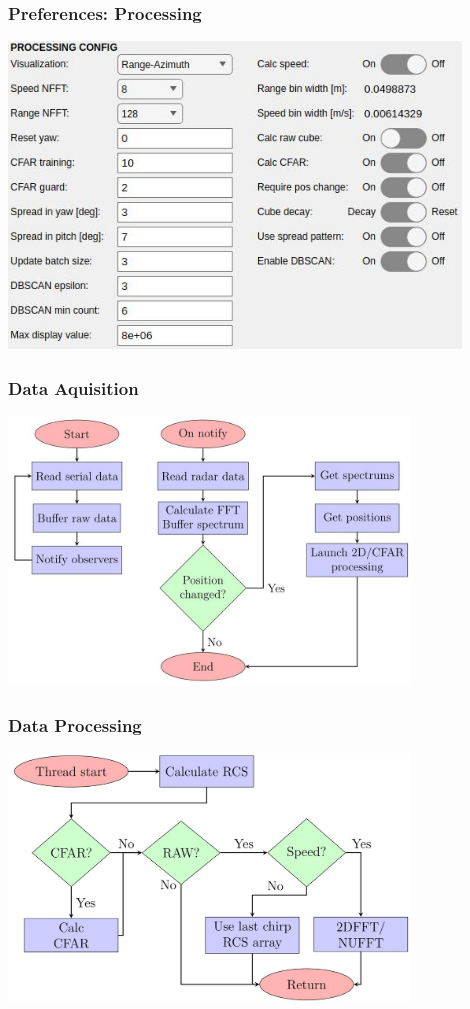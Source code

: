 \documentclass[aspectratio=43]{beamer}
\begin{document}
\begin{frame}[fragile]
  \frametitle{Preferences: Processing}
  \begin{center}
    \includegraphics[width=0.9\textwidth]{../img/preferences_crop2.jpg}
  \end{center}
\end{frame}

\begin{frame}[fragile]
  \frametitle{Data Aquisition}
  \begin{center}
    \includegraphics[width=0.8\textwidth]{../img/dataflow_1.jpg}
  \end{center}
\end{frame}

\begin{frame}[fragile]
  \frametitle{Data Processing}
  \begin{center}
    \includegraphics[width=0.8\textwidth]{../img/dataflow_2.jpg}
  \end{center}
\end{frame}
\end{document}
